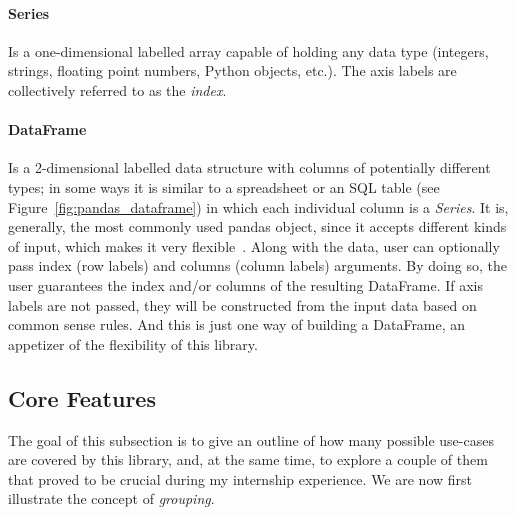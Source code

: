 \paragraph{Series} Is a one-dimensional labelled array capable of holding any data type (integers, strings, floating point numbers, Python objects, etc.).
The axis labels are collectively referred to as the \textit{index}.
\paragraph{DataFrame} Is a 2-dimensional labelled data structure with columns of potentially different types; in some ways it is similar to
a spreadsheet or an SQL table (see Figure~\ref{fig:pandas_dataframe}) in which each individual column is a \textit{Series}.
It is, generally, the most commonly used pandas object, since it accepts different kinds of input, which makes it very flexible~\cite{reback_pandas-dev/pandas:_2022}.
Along with the data, user
can optionally pass index (row labels) and columns (column labels) arguments. By doing so, the user guarantees the index and/or columns of the resulting DataFrame.
If axis labels are not passed, they will be constructed from the input data based on common sense rules.
And this is just one way of building a DataFrame, an appetizer of the flexibility of this library.

\subsection{Core Features}
The goal
of this subsection is to give an outline of how many possible use-cases are covered by this library, and, at the same time, to explore a couple of them that proved to be crucial during my internship experience.
We are now first illustrate the concept of \textit{grouping}.


